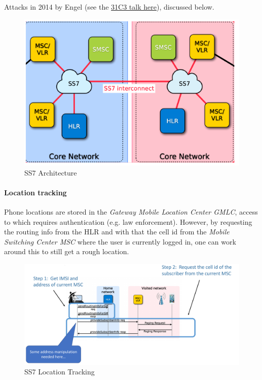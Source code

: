 Attacks in 2014 by Engel (see the \href{https://media.ccc.de/v/31c3\_-\_6249\_-\_en\_-\_saal\_1\_-\_201412271715\_-\_ss7\_locate\_track\_manipulate\_-\_tobias\_engel}{31C3 talk here}), discussed below.

\begin{figure}
	\centering
	\includegraphics[scale=0.5]{images/10-ss7.png}
	\caption{SS7 Architecture}
	\label{fig:ss7}
\end{figure}

\paragraph{Location tracking}
Phone locations are stored in the \textit{Gateway Mobile Location Center GMLC}, access to which requires authentication (e.g. law enforcement).
However, by requesting the routing info from the HLR and with that the cell id from the \textit{Mobile Switching Center MSC} where the user is currently logged in, one can work around this to still get a rough location.

\begin{figure}
	\centering
	\includegraphics[scale=0.4]{images/10-ss7-location.png}
	\caption{SS7 Location Tracking}
	\label{fig:ss7-location}
\end{figure}

